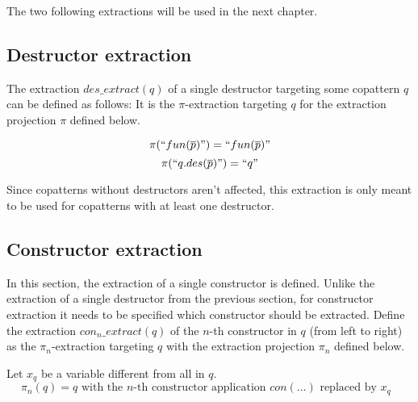 The two following extractions will be used in the next chapter.

\subsection{Destructor extraction}

The extraction $des\_extract(q)$ of a single destructor targeting some copattern $q$ can be defined as follows: It is the $\pi$-extraction targeting $q$ for the extraction projection $\pi$ defined below.

\[
\pi(`` fun(\overline{p}) ") = `` fun(\overline{p}) "
\]
\[
\pi(`` q.des(\overline{p}) ") = `` q "
\]

Since copatterns without destructors aren't affected, this extraction is only meant to be used for copatterns with at least one destructor. 

\subsection{Constructor extraction}

In this section, the extraction of a single constructor is defined. Unlike the extraction of a single destructor from the previous section, for constructor extraction it needs to be specified which constructor should be extracted. Define the extraction $con_n\_extract(q)$ of the $n$-th constructor in $q$ (from left to right) as the $\pi_n$-extraction targeting $q$ with the extraction projection $\pi_n$ defined below.

Let $x_q$ be a variable different from all in $q$.
\[
\pi_n(q) = q \text{ with the $n$-th constructor application } con(...) \text{ replaced by $x_q$ }
\]